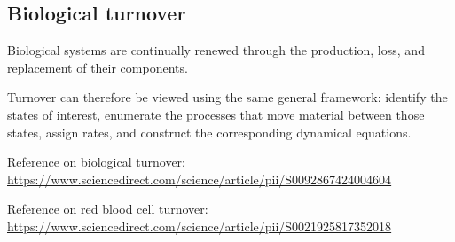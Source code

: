 \subsection{Biological turnover}

Biological systems are continually renewed through the production, loss, and replacement of their components.

Turnover can therefore be viewed using the same general framework: identify the states of interest, enumerate the processes that move material between those states, assign rates, and construct the corresponding dynamical equations.

Reference on biological turnover:
\url{https://www.sciencedirect.com/science/article/pii/S0092867424004604}

Reference on red blood cell turnover:
\url{https://www.sciencedirect.com/science/article/pii/S0021925817352018}
